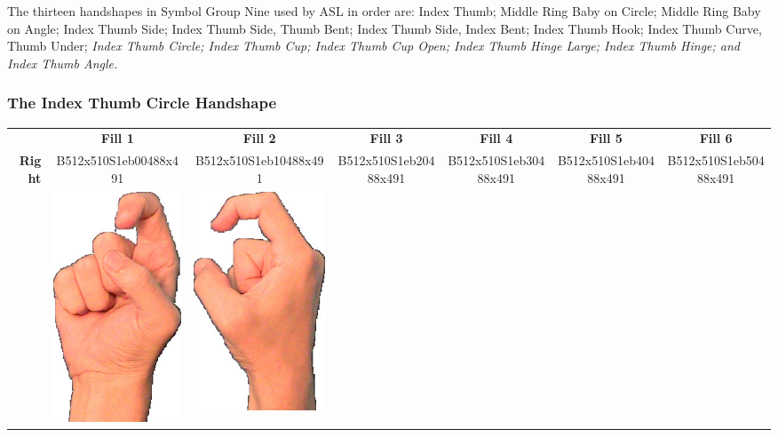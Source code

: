 \documentclass{article}
\begin{document}
The thirteen handshapes in Symbol Group Nine used by ASL in order are:
Index Thumb;
Middle Ring Baby on Circle;
Middle Ring Baby on Angle;
Index Thumb Side;
Index Thumb Side, Thumb Bent;
Index Thumb Side, Index Bent;
Index Thumb Hook;
Index Thumb Curve, Thumb Under;
{\it
Index Thumb Circle;
Index Thumb Cup;
Index Thumb Cup Open;
Index Thumb Hinge Large;
Index Thumb Hinge;
and Index Thumb Angle.
}

\subsubsection{The Index Thumb Circle Handshape}

\begin{center}
\begin{tabular}{r*{6}{c}}
&\textbf{Fill 1}&\textbf{Fill 2}&\textbf{Fill 3}&\textbf{Fill 4}&\textbf{Fill 5}&\textbf{Fill 6}\\
\multirow{2}{*}{\textbf{Right}}&
B512x510S1eb00488x491&
B512x510S1eb10488x491&
B512x510S1eb20488x491&
B512x510S1eb30488x491&
B512x510S1eb40488x491&
B512x510S1eb50488x491\\
&
\includegraphics[scale=0.1]{images/09-09-1.jpg}&
\includegraphics[scale=0.1]{images/09-09-2.jpg}&

\end{tabular}
\end{center}
\end{document}
